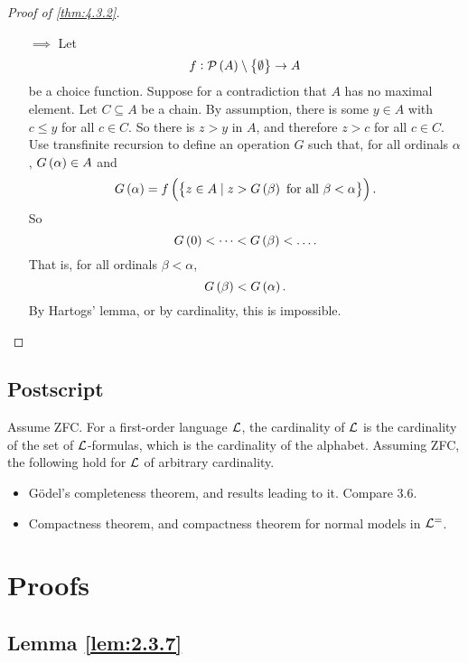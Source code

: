 \begin{proof}[Proof of \ref{thm:4.3.2}]
\hfill
\begin{itemize}
\item[$ \implies $] Let
$$ f : \PP \br{A} \setminus \cbr{\emptyset} \to A $$
be a choice function. Suppose for a contradiction that $ A $ has no maximal element. Let $ C \subseteq A $ be a chain. By assumption, there is some $ y \in A $ with $ c \le y $ for all $ c \in C $. So there is $ z > y $ in $ A $, and therefore $ z > c $ for all $ c \in C $. Use transfinite recursion to define an operation $ G $ such that, for all ordinals $ \alpha $, $ G\br{\alpha} \in A $ and
$$ G\br{\alpha} = f\br{\cbr{z \in A \mid z > G\br{\beta} \ \text{for all} \ \beta < \alpha}}. $$
So
$$ G\br{0} < \dots < G\br{\beta} < \dots. $$
That is, for all ordinals $ \beta < \alpha $,
$$ G\br{\beta} < G\br{\alpha}. $$
By Hartogs' lemma, or by cardinality, this is impossible.
\end{itemize}
\end{proof}

\pagebreak

\subsection{Postscript}

Assume ZFC. For a first-order language $ \mathcal{L} $, the cardinality of $ \mathcal{L} $ is the cardinality of the set of $ \mathcal{L} $-formulas, which is the cardinality of the alphabet. Assuming ZFC, the following hold for $ \mathcal{L} $ of arbitrary cardinality.
\begin{itemize}
\item G\"odel's completeness theorem, and results leading to it. Compare 3.6.
\item Compactness theorem, and compactness theorem for normal models in $ \mathcal{L}^= $.
\end{itemize}

\pagebreak

\appendix

\section{Proofs}

\subsection{Lemma \ref{lem:2.3.7}}


